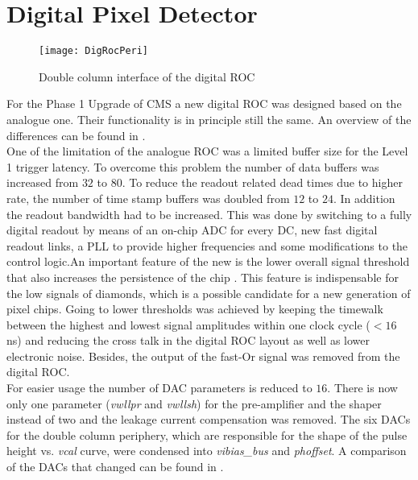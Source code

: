 \documentclass[british,11pt,a4paper]{memoir}
\begin{document}
\section{Digital Pixel Detector}\label{s23}
\begin{wrapfigure}{r}{4.5cm}
	\vspace*{-10pt}
	\texttt{[image: DigRocPeri]}
	\caption{Double column interface of the digital \ac{ROC} \cite{hits}}
	\label{p12}
	\vspace*{-15pt}
\end{wrapfigure} 
For the Phase 1 Upgrade of \ac{CMS} a new digital \ac{ROC} was designed based on the analogue one. Their functionality is in principle still the same. An overview of the differences can be found in .\\
One of the limitation of the analogue \ac{ROC} was a limited buffer size for the Level 1 trigger latency. To overcome this problem the number of data buffers was increased from $32$ to $80$. To reduce the readout related dead times due to higher rate, the number of time stamp buffers was doubled from $12$ to $24$. In addition the readout bandwidth had to be increased. This was done by switching to a fully digital readout by means of an on-chip \ac{ADC} for every \ac{DC}, new fast digital readout links, a \ac{PLL} to provide higher frequencies and some modifications to the control logic.An important feature of the new is the lower overall signal threshold that also increases the persistence of the chip \cite{hits}. This feature is indispensable for the low signals of diamonds, which is a possible candidate for a new generation of pixel chips. Going to lower thresholds was achieved by keeping the timewalk between the highest and lowest signal amplitudes within one clock cycle ($<16\,$ns) and reducing the cross talk in the digital \ac{ROC} layout as well as lower electronic noise. Besides, the output of the fast-Or signal was removed from the digital \ac{ROC}.\\
For easier usage the number of \ac{DAC} parameters is reduced to $16$. There is now only one parameter (\textit{vwllpr} and \textit{vwllsh}) for the pre-amplifier and the shaper instead of two and the leakage current compensation was removed. The six \ac{DAC}s for the double column periphery, which are responsible for the shape of the pulse height vs. \textit{vcal} curve, were condensed into \textit{vibias\_bus} and \textit{phoffset}. A comparison of the \ac{DAC}s that changed can be found in .
\end{document}
